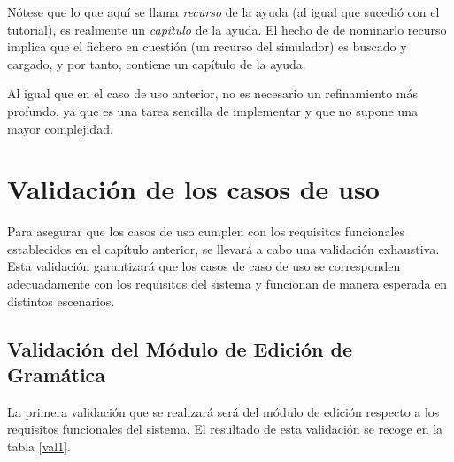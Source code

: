 Nótese que lo que aquí se llama \textit{recurso} de la ayuda (al igual que sucedió con el tutorial), es realmente un \textit{capítulo} de la ayuda. El hecho de de nominarlo recurso implica que el fichero en cuestión (un recurso del simulador) es buscado y cargado, y por tanto, contiene un capítulo de la ayuda.

Al igual que en el caso de uso anterior, no es necesario un refinamiento más profundo, ya que es una tarea sencilla de implementar y que no supone una mayor complejidad.

 \section{Validación de los casos de uso }

Para asegurar que los casos de uso cumplen con los requisitos funcionales establecidos en el capítulo anterior, se llevará a cabo una validación exhaustiva. Esta validación garantizará que los casos de caso de uso se corresponden adecuadamente con los requisitos del sistema y funcionan de manera esperada en distintos escenarios.




 \subsection{Validación del Módulo de Edición de Gramática}

 La primera validación que se realizará será del módulo de edición respecto a los requisitos funcionales del sistema. El resultado de esta validación se recoge en la tabla \ref{val1}.

